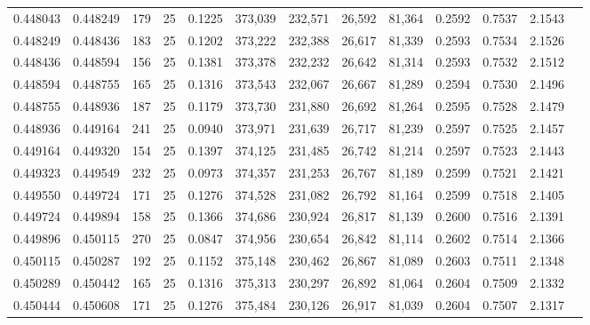 \begin{tabular}{rrrrrrrrrrrrr}
0.448043 & 0.448249 &   179 &  25 &                                     0.1225 & 373,039 & 232,571 &  26,592 &  81,364 & 0.2592 & 0.7537 & 2.1543 \\
0.448249 & 0.448436 &   183 &  25 &                                     0.1202 & 373,222 & 232,388 &  26,617 &  81,339 & 0.2593 & 0.7534 & 2.1526 \\
0.448436 & 0.448594 &   156 &  25 &                                     0.1381 & 373,378 & 232,232 &  26,642 &  81,314 & 0.2593 & 0.7532 & 2.1512 \\
0.448594 & 0.448755 &   165 &  25 &                                     0.1316 & 373,543 & 232,067 &  26,667 &  81,289 & 0.2594 & 0.7530 & 2.1496 \\
0.448755 & 0.448936 &   187 &  25 &                                     0.1179 & 373,730 & 231,880 &  26,692 &  81,264 & 0.2595 & 0.7528 & 2.1479 \\
0.448936 & 0.449164 &   241 &  25 &                                     0.0940 & 373,971 & 231,639 &  26,717 &  81,239 & 0.2597 & 0.7525 & 2.1457 \\
0.449164 & 0.449320 &   154 &  25 &                                     0.1397 & 374,125 & 231,485 &  26,742 &  81,214 & 0.2597 & 0.7523 & 2.1443 \\
0.449323 & 0.449549 &   232 &  25 &                                     0.0973 & 374,357 & 231,253 &  26,767 &  81,189 & 0.2599 & 0.7521 & 2.1421 \\
0.449550 & 0.449724 &   171 &  25 &                                     0.1276 & 374,528 & 231,082 &  26,792 &  81,164 & 0.2599 & 0.7518 & 2.1405 \\
0.449724 & 0.449894 &   158 &  25 &                                     0.1366 & 374,686 & 230,924 &  26,817 &  81,139 & 0.2600 & 0.7516 & 2.1391 \\
0.449896 & 0.450115 &   270 &  25 &                                     0.0847 & 374,956 & 230,654 &  26,842 &  81,114 & 0.2602 & 0.7514 & 2.1366 \\
0.450115 & 0.450287 &   192 &  25 &                                     0.1152 & 375,148 & 230,462 &  26,867 &  81,089 & 0.2603 & 0.7511 & 2.1348 \\
0.450289 & 0.450442 &   165 &  25 &                                     0.1316 & 375,313 & 230,297 &  26,892 &  81,064 & 0.2604 & 0.7509 & 2.1332 \\
0.450444 & 0.450608 &   171 &  25 &                                     0.1276 & 375,484 & 230,126 &  26,917 &  81,039 & 0.2604 & 0.7507 & 2.1317 \\

\end{tabular}
